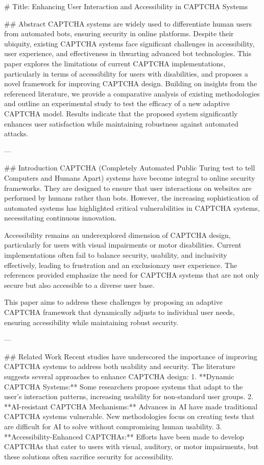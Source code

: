 # Title: Enhancing User Interaction and Accessibility in CAPTCHA Systems

## Abstract
CAPTCHA systems are widely used to differentiate human users from automated bots, ensuring security in online platforms. Despite their ubiquity, existing CAPTCHA systems face significant challenges in accessibility, user experience, and effectiveness in thwarting advanced bot technologies. This paper explores the limitations of current CAPTCHA implementations, particularly in terms of accessibility for users with disabilities, and proposes a novel framework for improving CAPTCHA design. Building on insights from the referenced literature, we provide a comparative analysis of existing methodologies and outline an experimental study to test the efficacy of a new adaptive CAPTCHA model. Results indicate that the proposed system significantly enhances user satisfaction while maintaining robustness against automated attacks.

---

## Introduction
CAPTCHA (Completely Automated Public Turing test to tell Computers and Humans Apart) systems have become integral to online security frameworks. They are designed to ensure that user interactions on websites are performed by humans rather than bots. However, the increasing sophistication of automated systems has highlighted critical vulnerabilities in CAPTCHA systems, necessitating continuous innovation.

Accessibility remains an underexplored dimension of CAPTCHA design, particularly for users with visual impairments or motor disabilities. Current implementations often fail to balance security, usability, and inclusivity effectively, leading to frustration and an exclusionary user experience. The references provided emphasize the need for CAPTCHA systems that are not only secure but also accessible to a diverse user base.

This paper aims to address these challenges by proposing an adaptive CAPTCHA framework that dynamically adjusts to individual user needs, ensuring accessibility while maintaining robust security.

---

## Related Work
Recent studies have underscored the importance of improving CAPTCHA systems to address both usability and security. The literature suggests several approaches to enhance CAPTCHA design:
1. **Dynamic CAPTCHA Systems:** Some researchers propose systems that adapt to the user's interaction patterns, increasing usability for non-standard user groups.
2. **AI-resistant CAPTCHA Mechanisms:** Advances in AI have made traditional CAPTCHA systems vulnerable. New methodologies focus on creating tests that are difficult for AI to solve without compromising human usability.
3. **Accessibility-Enhanced CAPTCHAs:** Efforts have been made to develop CAPTCHAs that cater to users with visual, auditory, or motor impairments, but these solutions often sacrifice security for accessibility.

